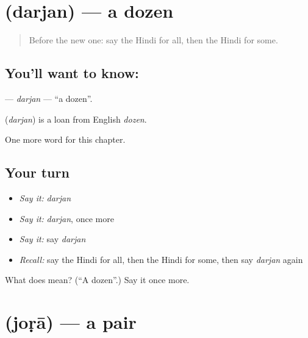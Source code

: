\section[\texorpdfstring{\hi{दर्जन} (darjan)}{दर्जन (darjan)}]{ (darjan) — a dozen}

\label{lesson:HI-C245-darjan}



\begin{quote}
Before the new one: say the Hindi for all, then the Hindi for some.
\end{quote}

\subsection*{You'll want to know: }
\textbf{} — \emph{darjan} — \textquotedblleft{}a dozen\textquotedblright{}.

\begin{cousinweb}
\textbf{} (\emph{darjan}) is a loan from English \emph{dozen}.
\end{cousinweb}

\begin{grammarlens}[title={What you've built}]
One more word for this chapter.
\end{grammarlens}

\subsection*{Your turn}
\begin{itemize}
\raggedright
  \item \emph{Say it:} \emph{darjan}
  \item \emph{Say it:} \emph{darjan}, once more
  \item \emph{Say it:} say \emph{darjan}
  \item \emph{Recall:} say the Hindi for all, then the Hindi for some, then say \emph{darjan} again
\end{itemize}

\begin{tcolorbox}[breakable,colback=teal!4,colframe=teal!35!black,title={Before you move on}]
What does  mean? (\textquotedblleft{}A dozen\textquotedblright{}.) Say it once more.
\end{tcolorbox}
\section[\texorpdfstring{\hi{जोड़ा} (joṛā)}{जोड़ा (joṛā)}]{ (joṛā) — a pair}

